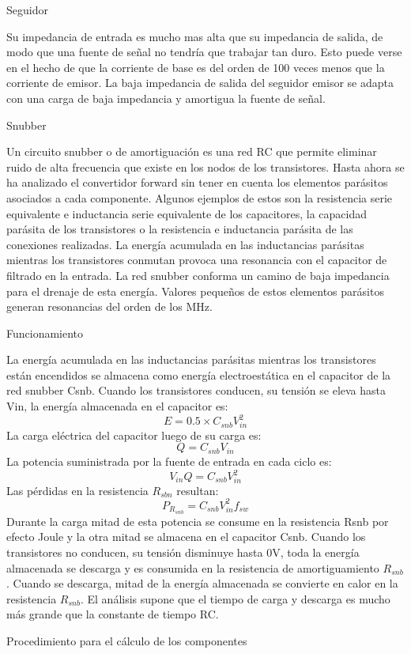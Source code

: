 Seguidor

Su impedancia de entrada es mucho mas alta que su impedancia de salida, de modo que una fuente de señal no tendría que trabajar tan duro.
 Esto puede verse en el hecho de que la corriente de base es del orden de 100 veces menos que la corriente de emisor. 
 La baja impedancia de salida del seguidor emisor se adapta con una carga de baja impedancia y amortigua la fuente de señal.

Snubber

Un circuito snubber o de amortiguación es una red RC que permite eliminar ruido de alta frecuencia que existe en los nodos de los transistores.
Hasta ahora se ha analizado el convertidor forward sin tener en cuenta los elementos parásitos asociados a cada componente. 
Algunos ejemplos de estos son la resistencia serie equivalente e inductancia serie equivalente de los capacitores, 
la capacidad parásita de los transistores o la resistencia e inductancia parásita de las conexiones realizadas. 
La energía acumulada en las inductancias parásitas mientras los transistores conmutan provoca una resonancia con el capacitor de filtrado en la entrada. 
La red snubber conforma un camino de baja impedancia para el drenaje de esta energía. 
Valores pequeños de estos elementos parásitos generan resonancias del orden de los MHz. 

Funcionamiento 

La energía acumulada en las inductancias parásitas mientras los transistores están encendidos se almacena como energía electroestática en el capacitor de la red snubber Csnb. 
Cuando los transistores conducen, su tensión se eleva hasta Vin, la energía almacenada en el capacitor es: 
$$ E=0.5\times C_{snb}V_{in}^{2} $$
La carga eléctrica del capacitor luego de su carga es:
$$ Q=C_{snb}V_{in} $$
La potencia suministrada por la fuente de entrada en cada ciclo es:
$$ V_{in}Q=C_{snb}V_{in}^{2} $$
Las pérdidas en la resistencia $R_{sbn}$ resultan:
$$ P_{R_{snb}}=C_{snb}V_{in}^{2}f_{sw} $$
Durante la carga mitad de esta potencia se consume en la resistencia Rsnb por efecto Joule y la otra mitad se almacena en el capacitor Csnb. 
Cuando los transistores no conducen, su tensión disminuye hasta 0V, toda la energía almacenada se descarga y es consumida en la resistencia de amortiguamiento $R_{snb}$.
Cuando se descarga, mitad de la energía almacenada se convierte en calor en la resistencia $R_{snb}$. 
El análisis supone que el tiempo de carga y descarga es mucho más grande que la constante de tiempo RC. 

Procedimiento para el cálculo de los componentes

